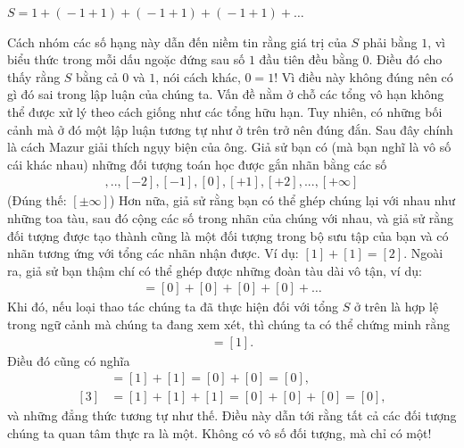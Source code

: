 \begin{multicols}{2}
	\vskip 0.15cm
	\centerline{$S \!=\! 1 \!+\! (\!-\! 1 \!+\! 1) \!+\! (\!-\! 1 \!+\! 1) \!+\! (\!-\! 1 \!+\! 1) \!+\! \ldots$}
	\vskip 0.05cm
	Cách nhóm các số hạng này dẫn đến niềm tin rằng giá trị của $S$ phải bằng $1$, vì biểu thức trong mỗi dấu ngoặc đứng sau số $1$ đầu tiên đều bằng $0$.
	\vskip 0.05cm
	Điều đó cho thấy rằng $S$ bằng cả $0$ và $1$, nói cách khác, $0 = 1$! Vì điều này không đúng nên có gì đó sai trong lập luận của chúng ta. Vấn đề nằm ở chỗ các tổng vô hạn không thể được xử lý theo cách giống như các tổng hữu hạn.
	\vskip 0.05cm
	Tuy nhiên, có những bối cảnh mà ở  đó một lập luận tương tự như ở trên trở nên đúng đắn. Sau đây chính là cách Mazur giải thích ngụy biện của ông.
	\vskip 0.05cm
	Giả sử bạn có (mà bạn nghĩ là vô số cái khác nhau) những đối tượng toán học được gắn nhãn bằng các số
	\begin{align*}
		[- \infty], .., [-2], [-1], [0], [+1], [+2], ..., [+\infty]
	\end{align*}
	(Đúng thế: $[\pm {\infty}] $)
	\vskip 0.05cm
	Hơn nữa, giả sử rằng bạn có thể ghép chúng lại với nhau như những toa tàu, sau đó cộng các số trong nhãn của chúng với nhau, và giả sử rằng đối tượng được tạo thành cũng là một đối tượng trong bộ sưu tập của bạn và có nhãn tương ứng với tổng các nhãn nhận được. Ví dụ: $ [1] + [1] = [2]$. 
	\vskip 0.05cm
	Ngoài ra, giả sử bạn thậm chí có thể ghép  được những đoàn tàu dài vô tận, ví dụ:
	\begin{align*}
		[0] = [0] + [0] + [0] + [0] + \ldots
	\end{align*}
	Khi đó, nếu loại thao tác chúng ta đã thực hiện đối với tổng $S$ ở trên là hợp lệ trong ngữ cảnh mà chúng ta đang xem xét, thì chúng ta có thể chứng minh rằng
	\begin{align*}
		[0] = [ 1].
	\end{align*}
	Điều đó cũng có nghĩa
	\begin{align*}
		 [2] &= [1] + [1] = [0] + [0] = [0],\\
		[3] &= [1] + [1] + [1] = [0] + [0] + [0] = [0],
	\end{align*}
	và những đẳng thức tương tự như thế.
	\vskip 0.05cm
	Điều này dẫn tới rằng tất cả các đối tượng chúng ta quan tâm thực ra là một. Không có vô số đối tượng, mà chỉ có một!
\end{multicols}